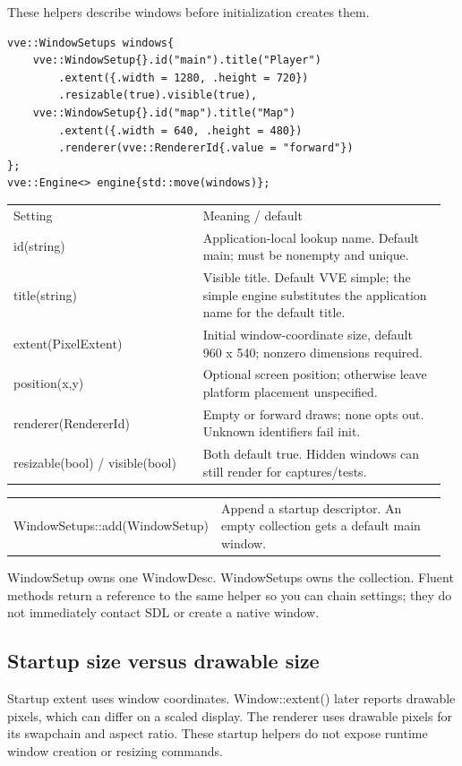 \documentclass[11pt,a4paper]{article}
\begin{document}
\label{core-11}
These helpers describe windows before initialization creates them.

\begin{lstlisting}[language={}]
vve::WindowSetups windows{
    vve::WindowSetup{}.id("main").title("Player")
        .extent({.width = 1280, .height = 720})
        .resizable(true).visible(true),
    vve::WindowSetup{}.id("map").title("Map")
        .extent({.width = 640, .height = 480})
        .renderer(vve::RendererId{.value = "forward"})
};
vve::Engine<> engine{std::move(windows)};
\end{lstlisting}

{\small
\begin{longtable}{@{}p{0.42\linewidth}p{0.54\linewidth}@{}}
Setting & Meaning / default \\
id(string) & Application-local lookup name. Default main; must be nonempty and unique. \\
title(string) & Visible title. Default VVE simple; the simple engine substitutes the application name for the default title. \\
extent(PixelExtent) & Initial window-coordinate size, default 960 x 540; nonzero dimensions required. \\
position(x,y) & Optional screen position; otherwise leave platform placement unspecified. \\
renderer(RendererId) & Empty or forward draws; none opts out. Unknown identifiers fail init. \\
resizable(bool) / visible(bool) & Both default true. Hidden windows can still render for captures/tests. \\
\end{longtable}
}

{\small
\begin{longtable}{@{}p{0.42\linewidth}p{0.54\linewidth}@{}}
WindowSetups::add(WindowSetup) & Append a startup descriptor. An empty collection gets a default main window. \\
\end{longtable}
}

WindowSetup owns one WindowDesc. WindowSetups owns the collection. Fluent methods return a reference to the same helper so you can chain settings; they do not immediately contact SDL or create a native window.

\subsection*{Startup size versus drawable size}
Startup extent uses window coordinates. Window::extent() later reports drawable pixels, which can differ on a scaled display. The renderer uses drawable pixels for its swapchain and aspect ratio. These startup helpers do not expose runtime window creation or resizing commands.
\end{document}
